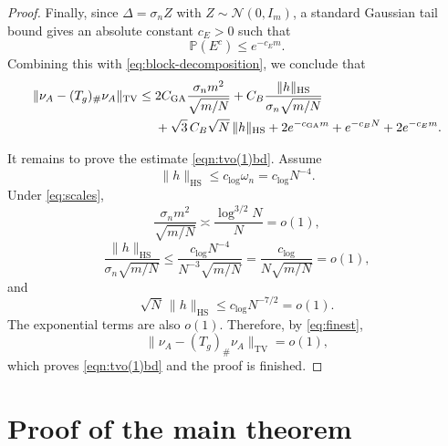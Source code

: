 \documentclass[11pt, reqno]{amsart}
\numberwithin{equation}{section}
\theoremstyle{remark}
\newcommand{\Prob}{\mathbb{P}}
\newcommand{\1}{\mathbf{1}}
\newcommand{\HS}{\mathrm{HS}}
\newcommand{\TV}{\mathrm{TV}}
\begin{document}
\begin{proof}
Finally, since \(\Delta=\sigma_n Z\) with \(Z\sim\mathcal N(0,I_m)\), a standard
Gaussian tail bound gives an absolute constant \(c_E>0\) such that
\[
\Prob(E^c)\le e^{-c_Em}.
\]
Combining this with \eqref{eq:block-decomposition}, we conclude that
\begin{align}
\label{eq:finest}
\|\nu_A-(T_g)_\#\nu_A\|_{\TV}
\le\;&
2C_{\mathrm{GA}}\frac{\sigma_n m^2}{\sqrt{m/N}}
+
C_B\frac{\|h\|_{\HS}}{\sigma_n\sqrt{m/N}} \notag\\
&+
\sqrt3\,C_B\sqrt N\,\|h\|_{\HS}
+
2e^{-c_{\mathrm{GA}}m}
+
e^{-c_BN}
+
2e^{-c_Em}.
\end{align}

It remains to prove the estimate \eqref{eqn:tvo(1)bd}. Assume
\[
\|h\|_{\HS}\le c_{\log}\omega_n=c_{\log}N^{-4}.
\]
Under \eqref{eq:scales},
\[
\frac{\sigma_n m^2}{\sqrt{m/N}}
\asymp
\frac{\log^{3/2}N}{N}
=o(1),
\]
\[
\frac{\|h\|_{\HS}}{\sigma_n\sqrt{m/N}}
\le
\frac{c_{\log}N^{-4}}{N^{-3}\sqrt{m/N}}
=
\frac{c_{\log}}{N\sqrt{m/N}}
=o(1),
\]
and
\[
\sqrt N\,\|h\|_{\HS}
\le
c_{\log}N^{-7/2}
=o(1).
\]
The exponential terms are also $o(1)$. Therefore, by \eqref{eq:finest},
\[
\|\nu_A-(T_g)_\#\nu_A\|_{\TV}=o(1),
\]
which proves \eqref{eqn:tvo(1)bd} and the proof is finished.
\end{proof}

\section{Proof of the main theorem}
\label{sec:proof-main}
\end{document}
